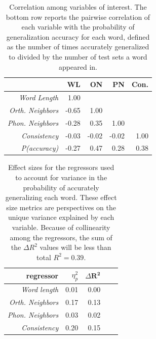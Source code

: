 \documentclass[10pt,letterpaper]{article}
\begin{document}
\begin{table}
	\begin{tabular}{r r r r r}
		                     & WL & ON & PN & Con. \\
       \toprule
		\textit{Word Length}          &  1.00 & & & \\
		\textit{Orth. Neighbors}      & -0.65 &  1.00 & & \\
		\textit{Phon. Neighbors}      & -0.28 &  0.35 &  1.00 & \\
		\textit{Consistency}          & -0.03 & -0.02 & -0.02 & 1.00 \\
		\midrule
		\textit{P(accuracy)}          & -0.27  & 0.47 & 0.28 & 0.38 \\
	\end{tabular}
	\caption{Correlation among variables of interest. The bottom row reports the pairwise correlation of each variable with the probability of generalization accuracy for each word, defined as the number of times accurately generalized to divided by the number of test sets a word appeared in.} 
	\label{tab:cormat}
\end{table}

%
%	

\begin{table}[b]
	\begin{center}
		\begin{tabular}{r r r r r}
			\textbf{regressor} & $\eta^2_p$ & $\Delta \mathbf{R^2}$ \\
			\toprule
\textit{Word length}       & 0.01 & 0.00 \\
\textit{Orth. Neighbors}   & 0.17 & 0.13 \\
\textit{Phon. Neighbors}   & 0.03 & 0.02 \\
\textit{Consistency}       & 0.20 & 0.15 \\
\bottomrule

		\end{tabular}
		\caption{Effect sizes for the regressors used to account for variance in the probability of accurately generalizing each word. These effect size metrics are perspectives on the unique variance explained by each variable. Because of collinearity among the regressors, the sum of the $\Delta R^2$ values will be less than total $R^2 = 0.39$.}
		\label{tab:effectsize}
	\end{center}
\end{table}
\end{document}
